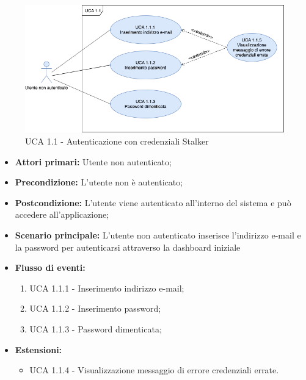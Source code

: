 \begin{figure}[h]

  \centering
    \includegraphics[scale=0.4]{sezioni/UseCase/Immagini/Login.png}
  \caption{UCA 1.1 - Autenticazione con credenziali Stalker}
\end{figure}

\begin{itemize}
\item \textbf{Attori primari:} Utente non autenticato;
\item \textbf{Precondizione:} L'utente non è autenticato;
\item \textbf{Postcondizione:} L'utente viene autenticato all'interno del sistema e può accedere all'applicazione;
\item \textbf{Scenario principale:} L'utente non autenticato inserisce l'indirizzo e-mail e la password per autenticarsi attraverso la dashboard iniziale%
\item \textbf{Flusso di eventi:} %
  \begin{enumerate}
        \item UCA 1.1.1 - Inserimento indirizzo e-mail;
        \item UCA 1.1.2 - Inserimento password;
        \item UCA 1.1.3 - Password dimenticata;
    \end{enumerate}
\item \textbf{Estensioni:}
	\begin{itemize}
		\item UCA 1.1.4 - Visualizzazione messaggio di errore credenziali errate.
	\end{itemize}
\end{itemize}

